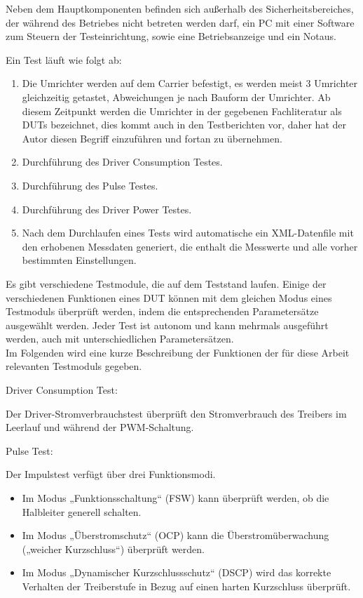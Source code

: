 Neben dem Hauptkomponenten befinden sich außerhalb des Sicherheitsbereiches, der während des Betriebes nicht betreten werden darf,
ein PC mit einer Software zum Steuern der Testeinrichtung, sowie eine Betriebsanzeige und ein Notaus. \cite*{Main_Manuel_USTB2018}

\newpage

Ein Test läuft wie folgt ab:

\begin{enumerate}
\item Die Umrichter werden auf dem Carrier befestigt, es werden meist 3 Umrichter gleichzeitig getastet, Abweichungen je nach Bauform der Umrichter.
Ab diesem Zeitpunkt werden die Umrichter in der gegebenen Fachliteratur als \ac{DUTs} bezeichnet, dies kommt auch in den Testberichten vor, daher hat der Autor diesen Begriff einzuführen und fortan zu übernehmen.


\item Durchführung des Driver Consumption Testes.


\item Durchführung des Pulse Testes.


\item Durchführung des Driver Power Testes.


\item Nach dem Durchlaufen eines Tests wird automatische ein XML-Datenfile mit den erhobenen Messdaten generiert, die enthalt die Messwerte und alle vorher bestimmten Einstellungen.


\end{enumerate}
Es gibt verschiedene Testmodule, die auf dem Teststand laufen.
Einige der verschiedenen Funktionen eines DUT können mit dem gleichen Modus eines Testmoduls überprüft werden, indem die entsprechenden Parametersätze ausgewählt werden.
Jeder Test ist autonom und kann mehrmals ausgeführt werden, auch mit unterschiedlichen Parametersätzen.
\\
Im Folgenden wird eine kurze Beschreibung der Funktionen der für diese Arbeit relevanten Testmoduls gegeben.

Driver Consumption Test:

Der Driver-Stromverbrauchstest überprüft den Stromverbrauch des Treibers im Leerlauf und während der PWM-Schaltung.

Pulse Test:

Der Impulstest verfügt über drei Funktionsmodi.
\begin{itemize}
    \item Im Modus „Funktionsschaltung“ (FSW) kann überprüft werden, ob die Halbleiter generell schalten.
    \item Im Modus „Überstromschutz“ (OCP) kann die Überstromüberwachung („weicher Kurzschluss“) überprüft werden.
    \item Im Modus „Dynamischer Kurzschlussschutz“ (DSCP) wird das korrekte Verhalten der Treiberstufe in Bezug auf einen harten Kurzschluss überprüft.
\end{itemize}


